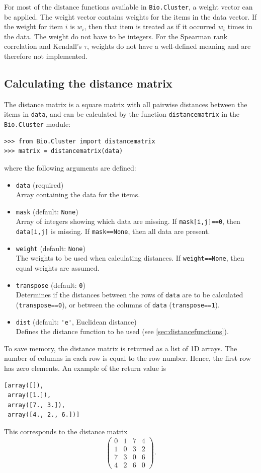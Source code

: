 \documentclass{report}
\begin{document}
For most of the distance functions available in \verb|Bio.Cluster|, a weight vector can be applied. The weight vector contains weights for the items in the data vector. If the weight for item $i$ is $w_i$, then that item is treated as if it occurred $w_i$ times in the data. The weight do not have to be integers.
For the Spearman rank correlation and Kendall's
$\tau$,
weights do not have a well-defined meaning and are therefore not implemented.

\subsection*{Calculating the distance matrix}
\label{subsec:distancematrix}

The distance matrix is a square matrix with all pairwise distances between the items in \verb|data|, and can be calculated by the function \verb|distancematrix| in the \verb|Bio.Cluster| module:
\begin{verbatim}
>>> from Bio.Cluster import distancematrix
>>> matrix = distancematrix(data)
\end{verbatim}
where the following arguments are defined:
\begin{itemize}
\item \verb|data| (required)\\
Array containing the data for the items.
\item \verb|mask| (default: \verb|None|) \\
Array of integers showing which data are missing. If \verb|mask[i,j]==0|, then \verb|data[i,j]| is missing. If \verb|mask==None|, then all data are present.
\item \verb|weight| (default: \verb|None|) \\
The weights to be used when calculating distances. If \verb|weight==None|, then equal weights are assumed.
\item \verb|transpose| (default: \verb|0|) \\
Determines if the distances between the rows of \verb|data| are to be calculated (\verb|transpose==0|), or between the columns of \verb|data| (\verb|transpose==1|).
\item \verb|dist| (default: \verb|'e'|, Euclidean distance) \\
Defines the distance function to be used (see \ref{sec:distancefunctions}).
\end{itemize}

To save memory, the distance matrix is returned as a list of 1D arrays.
The number of columns in each row is equal to the row number. Hence, the first row has zero elements. An example of the return value is
\begin{verbatim}
[array([]),
 array([1.]),
 array([7., 3.]),
 array([4., 2., 6.])]
\end{verbatim}
This corresponds to the distance matrix
$$
\left(
\begin{array}{cccc}
0 & 1 & 7 & 4  \\
1 & 0 & 3 & 2  \\
7 & 3 & 0 & 6  \\
4 & 2 & 6 & 0
\end{array}
\right).
$$
\end{document}
